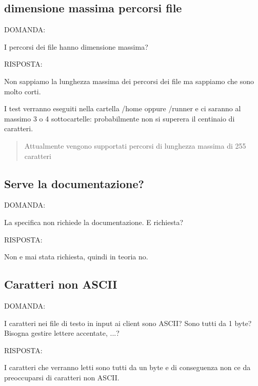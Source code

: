 \subsection*{dimensione massima percorsi file}

D\+O\+M\+A\+N\+DA\+:

I percorsi dei file hanno dimensione massima?

R\+I\+S\+P\+O\+S\+TA\+:

Non sappiamo la lunghezza massima dei percorsi dei file ma sappiamo che sono molto corti.

I test verranno eseguiti nella cartella {\ttfamily /home} oppure {\ttfamily /runner} e ci saranno al massimo 3 o 4 sottocartelle\+: probabilmente non si superera\textquotesingle{} il centinaio di caratteri. \begin{quote}
Attualmente vengono supportati percorsi di lunghezza massima di 255 caratteri \end{quote}


\subsection*{Serve la documentazione?}

D\+O\+M\+A\+N\+DA\+:

La specifica non richiede la documentazione. E\textquotesingle{} richiesta?

R\+I\+S\+P\+O\+S\+TA\+:

Non e\textquotesingle{} mai stata richiesta, quindi in teoria no.

\subsection*{Caratteri non A\+S\+C\+II}

D\+O\+M\+A\+N\+DA\+:

I caratteri nei file di testo in input ai client sono A\+S\+C\+II? Sono tutti da 1 byte? Bisogna gestire lettere accentate, ...?

R\+I\+S\+P\+O\+S\+TA\+:

I caratteri che verranno letti sono tutti da un byte e di conseguenza non c\textquotesingle{}e\textquotesingle{} da preoccuparsi di caratteri non A\+S\+C\+II. 